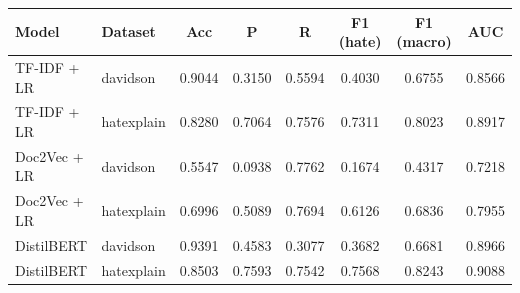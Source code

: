 \begin{tabular}{llcccccc}
\toprule
Model & Dataset & Acc & P & R & F1 (hate) & F1 (macro) & AUC \\
\midrule
TF-IDF + LR & davidson & 0.9044 & 0.3150 & 0.5594 & 0.4030 & 0.6755 & 0.8566 \\
TF-IDF + LR & hatexplain & 0.8280 & 0.7064 & 0.7576 & 0.7311 & 0.8023 & 0.8917 \\
Doc2Vec + LR & davidson & 0.5547 & 0.0938 & 0.7762 & 0.1674 & 0.4317 & 0.7218 \\
Doc2Vec + LR & hatexplain & 0.6996 & 0.5089 & 0.7694 & 0.6126 & 0.6836 & 0.7955 \\
DistilBERT & davidson & 0.9391 & 0.4583 & 0.3077 & 0.3682 & 0.6681 & 0.8966 \\
DistilBERT & hatexplain & 0.8503 & 0.7593 & 0.7542 & 0.7568 & 0.8243 & 0.9088 \\
\bottomrule
\end{tabular}
